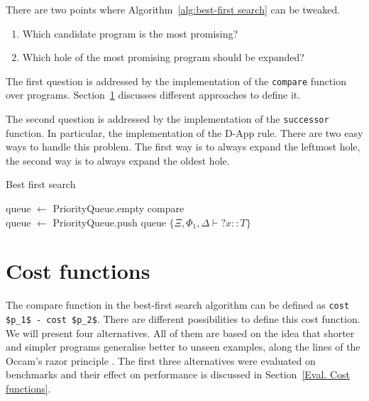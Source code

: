 There are two points where Algorithm~\ref{alg:best-first search} can be tweaked.
\begin{enumerate}
\item Which candidate program is the most promising?
\item Which hole of the most promising program should be expanded?
\end{enumerate}
The first question is addressed by the implementation of the \lstinline?compare? function over programs. Section~\ref{Cost functions} discusses different approaches to define it.

The second question is addressed by the implementation of the \lstinline?successor? function. In particular, the implementation of the D-App rule. There are two easy ways to handle this problem. The first way is to always expand the leftmost hole, the second way is to always expand the oldest hole.

\begin{algorithm}
\caption{Best first search\label{alg:best-first search}}

queue $\gets$ PriorityQueue.empty {\color{blue}compare}\\
queue $\gets$ PriorityQueue.push queue $\{\Xi, \Phi_1, \Delta \vdash {?x} :: T\}$\\

\end{algorithm}

\section{Cost functions}\label{Cost functions}
The compare function in the best-first search algorithm can be defined as \lstinline?cost $p_1$ - cost $p_2$?. There are different possibilities to define this cost function. We will present four alternatives. All of them are based on the idea that shorter and simpler programs generalise better to unseen examples, along the lines of the Occam's razor principle \cite{computationalLearningTheory}. The first three alternatives were evaluated on benchmarks and their effect on performance is discussed in Section~\ref{Eval. Cost functions}.

